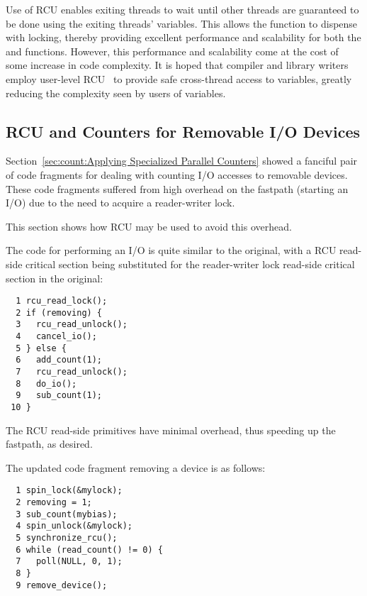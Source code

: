 Use of RCU enables exiting threads to wait until other threads are
guaranteed to be done using the exiting threads'  variables.
This allows the  function to dispense with locking,
thereby providing
excellent performance and scalability for both the 
and  functions.
However, this performance and scalability come at the cost of some increase
in code complexity.
It is hoped that compiler and library writers employ user-level
RCU~\cite{MathieuDesnoyers2009URCU} to provide safe cross-thread
access to  variables, greatly reducing the
complexity seen by users of  variables.

\subsection{RCU and Counters for Removable I/O Devices}
\label{sec:together:RCU and Counters for Removable I/O Devices}

Section~\ref{sec:count:Applying Specialized Parallel Counters}
showed a fanciful pair of code fragments for dealing with counting
I/O accesses to removable devices.
These code fragments suffered from high overhead on the fastpath
(starting an I/O) due to the need to acquire a reader-writer
lock.

This section shows how RCU may be used to avoid this overhead.

The code for performing an I/O is quite similar to the original, with
a RCU read-side critical section being substituted for the reader-writer
lock read-side critical section in the original:

\vspace{5pt}
\begin{minipage}[t]{\columnwidth}
\small
\begin{verbatim}
  1 rcu_read_lock();
  2 if (removing) {
  3   rcu_read_unlock();
  4   cancel_io();
  5 } else {
  6   add_count(1);
  7   rcu_read_unlock();
  8   do_io();
  9   sub_count(1);
 10 }
\end{verbatim}
\end{minipage}
\vspace{5pt}

The RCU read-side primitives have minimal overhead, thus speeding up
the fastpath, as desired.

The updated code fragment removing a device is as follows:

\vspace{5pt}
\begin{minipage}[t]{\columnwidth}
\small
\begin{verbatim}
  1 spin_lock(&mylock);
  2 removing = 1;
  3 sub_count(mybias);
  4 spin_unlock(&mylock);
  5 synchronize_rcu();
  6 while (read_count() != 0) {
  7   poll(NULL, 0, 1);
  8 }
  9 remove_device();
\end{verbatim}
\end{minipage}
\vspace{5pt}


